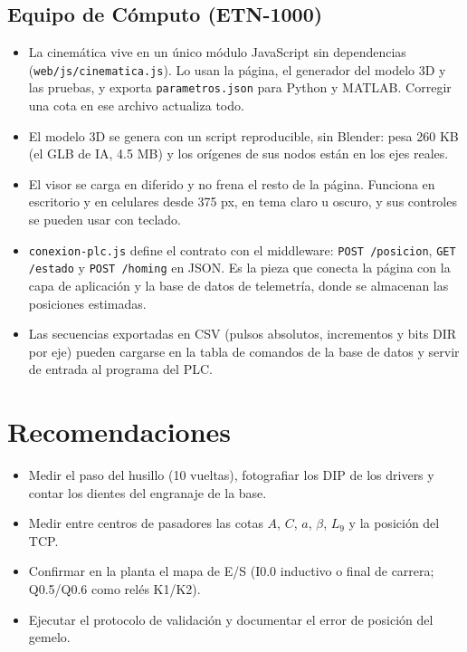 \documentclass[a4paper,12pt]{article}
\newcommand{\codigo}[1]{\texttt{\small #1}}
\begin{document}
\subsection{Equipo de Cómputo (ETN-1000)}
\begin{itemize}
\item La cinemática vive en un único módulo JavaScript sin dependencias (\codigo{web/js/cinematica.js}).
      Lo usan la página, el generador del modelo 3D y las pruebas, y exporta \codigo{parametros.json}
      para Python y MATLAB. Corregir una cota en ese archivo actualiza todo.
\item El modelo 3D se genera con un script reproducible, sin Blender: pesa 260 KB (el GLB de IA, 4.5 MB) y
      los orígenes de sus nodos están en los ejes reales.
\item El visor se carga en diferido y no frena el resto de la página. Funciona en escritorio y en
      celulares desde 375 px, en tema claro u oscuro, y sus controles se pueden usar con teclado.
\item \codigo{conexion-plc.js} define el contrato con el middleware: \codigo{POST /posicion},
      \codigo{GET /estado} y \codigo{POST /homing} en JSON. Es la pieza que conecta la página con la capa
      de aplicación y la base de datos de telemetría, donde se almacenan las posiciones estimadas.
\item Las secuencias exportadas en CSV (pulsos absolutos, incrementos y bits DIR por eje) pueden cargarse
      en la tabla de comandos de la base de datos y servir de entrada al programa del PLC.
\end{itemize}

\section{Recomendaciones}
\begin{itemize}
\item Medir el paso del husillo (10 vueltas), fotografiar los DIP de los drivers y contar los dientes del
      engranaje de la base.
\item Medir entre centros de pasadores las cotas $A$, $C$, $a$, $\beta$, $L_9$ y la posición del TCP.
\item Confirmar en la planta el mapa de E/S (I0.0 inductivo o final de carrera; Q0.5/Q0.6 como relés K1/K2).
\item Ejecutar el protocolo de validación y documentar el error de posición del gemelo.
\end{itemize}
\end{document}
